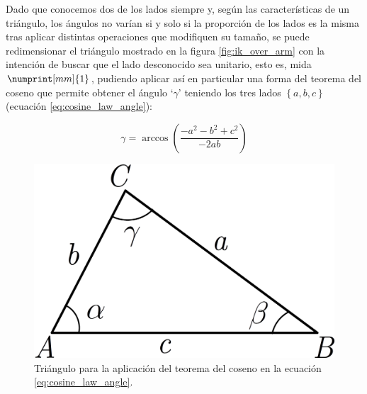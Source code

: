 Dado que conocemos dos de los lados siempre y, según las características de un triángulo,
los ángulos no varían si y solo si la proporción de los lados es la misma tras aplicar
distintas operaciones que modifiquen su tamaño, se puede redimensionar el triángulo
mostrado en la figura \ref{fig:ik_over_arm} con la intención de buscar que el lado
desconocido sea unitario, esto es, mida $\numprint[mm]{1}$, pudiendo aplicar así en particular una forma del
teorema del coseno que permite obtener el ángulo `$\gamma$' teniendo los tres lados $\left\{a,b,c\right\}$
(ecuación \ref{eq:cosine_law_angle}):

\begin{equation}\label{eq:cosine_law_angle}
    \gamma = \arccos{\left(\frac{-a^2 - b^2 + c^2}{-2ab}\right)}
\end{equation}

\begin{figure}[H]
    \centering
    \includegraphics[width=.3\linewidth]{pictures/cosine_law.png}
    \caption{Triángulo para la aplicación del teorema del coseno en la ecuación \ref{eq:cosine_law_angle}.}
    \label{fig:cosine_law_triangle}
\end{figure}

